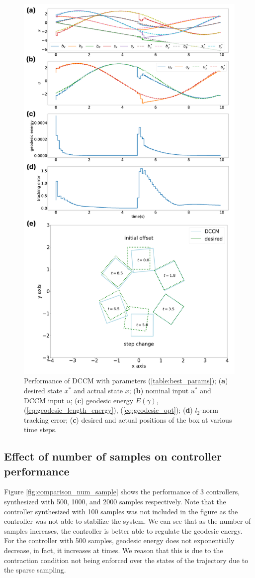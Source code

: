 \documentclass[journal]{IEEEtran}
\begin{document}
\begin{figure}[h]
	\centering\includegraphics[width = 0.47 \textwidth]
	{figures/result_lbw10_2000samples.png}
    \caption{Performance of DCCM with parameters (\ref{table:best_params}); (\textbf{a}) desired state $x^*$ and actual state $x$; (\textbf{b}) nominal input $u^*$ and DCCM input $u$; (\textbf{c}) geodesic energy $E(\bar{\gamma})$, (\ref{eq:geodesic_length_energy}), (\ref{eq:geodesic_opt}); (\textbf{d}) $l_2$-norm tracking error; (\textbf{c}) desired and actual positions of the box at various time steps.}
	\label{fig:result_2000}
\end{figure}

\subsection{Effect of number of samples on controller performance}
Figure \ref{fig:comparison_num_sample} shows the performance of 3 controllers, synthesized with 500, 1000, and 2000 samples respectively. Note that the controller synthesized with 100 samples was not included in the figure as the controller was not able to stabilize the system. We can see that as the number of samples increases, the controller is better able to regulate the geodesic energy. For the controller with 500 samples, geodesic energy does not exponentially decrease, in fact, it increases at times. We reason that this is due to the contraction condition not being enforced over the states of the trajectory due to the sparse sampling.
\end{document}
